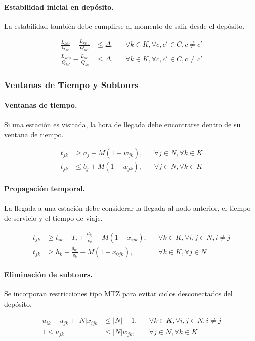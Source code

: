 \paragraph{Estabilidad inicial en depósito.}

La estabilidad también debe cumplirse al momento de salir desde el depósito.

\begin{align}
    \frac{L_{kc0}}{Q_{kc}}
    -
    \frac{L_{kc'0}}{Q_{kc'}}
    &\leq
    \Delta,
    && \forall k \in K, \forall c,c' \in C, c \neq c' \\
    \frac{L_{kc'0}}{Q_{kc'}}
    -
    \frac{L_{kc0}}{Q_{kc}}
    &\leq
    \Delta,
    && \forall k \in K, \forall c,c' \in C, c \neq c'
\end{align}

\subsubsection{Ventanas de Tiempo y Subtours}

\paragraph{Ventanas de tiempo.}

Si una estación es visitada, la hora de llegada debe encontrarse dentro de su ventana de tiempo.

\begin{align}
    t_{jk} &\geq a_j - M(1-w_{jk}),
    && \forall j \in N, \forall k \in K \\
    t_{jk} &\leq b_j + M(1-w_{jk}),
    && \forall j \in N, \forall k \in K
\end{align}

\paragraph{Propagación temporal.}

La llegada a una estación debe considerar la llegada al nodo anterior, el tiempo de servicio y el tiempo de viaje.

\begin{align}
    t_{jk}
    &\geq
    t_{ik} + T_i + \frac{d_{ij}}{v_k}
    -
    M(1-x_{ijk}),
    && \forall k \in K, \forall i,j \in N, i \neq j \\
    t_{jk}
    &\geq
    h_k + \frac{d_{0j}}{v_k}
    -
    M(1-x_{0jk}),
    && \forall k \in K, \forall j \in N
\end{align}

\paragraph{Eliminación de subtours.}

Se incorporan restricciones tipo MTZ para evitar ciclos desconectados del depósito.

\begin{align}
    u_{ik} - u_{jk} + |N|x_{ijk}
    &\leq |N|-1,
    && \forall k \in K, \forall i,j \in N, i \neq j \\
    1 \leq u_{jk}
    &\leq |N|w_{jk},
    && \forall j \in N, \forall k \in K
\end{align}